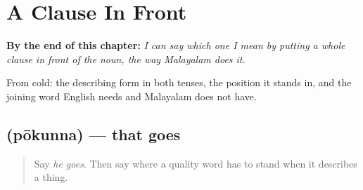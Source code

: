 
\chapter{A Clause In Front}
\label{ch:ml-participle}

\begin{chapteropening}
\textbf{By the end of this chapter:} \emph{I can say which one I mean by putting a whole clause in front of the noun, the way Malayalam does it.}

From cold: the describing form in both tenses, the position it stands in, and the joining word English needs and Malayalam does not have.
\end{chapteropening}

\section[\texorpdfstring{\ml{പോകുന്ന} (pōkunna)}{പോകുന്ന (pōkunna)}]{ (pōkunna) — that goes}

\label{lesson:ML-C90-participle}



\begin{quote}
Say \emph{he goes}. Then say where a quality word has to stand when it describes a thing.
\end{quote}

